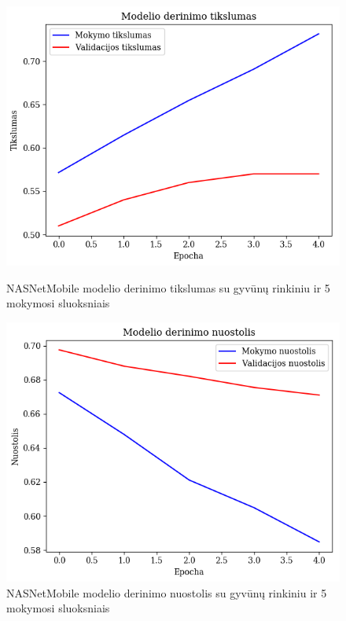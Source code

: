 \documentclass{VUMIFPSbakalaurinis}
\begin{document}
\begin{figure}[!htbp]
    \centering
    \begin{minipage}[b]{0.48\textwidth}
      \includegraphics[width=\textwidth]{img/GrapthsNEW/Small/animal/5/Acc_DC_S_5.png}
      \caption{NASNetMobile modelio derinimo tikslumas su gyvūnų rinkiniu ir 5 mokymosi sluoksniais}
    \end{minipage}
    \hspace{2mm}
    \begin{minipage}[b]{0.48\textwidth}
      \includegraphics[width=\textwidth]{img/GrapthsNEW/Small/animal/5/Loss_DC_S_5.png}
      \caption{NASNetMobile modelio derinimo nuostolis su gyvūnų rinkiniu ir 5 mokymosi sluoksniais}
    \end{minipage}
\end{figure}
\end{document}
